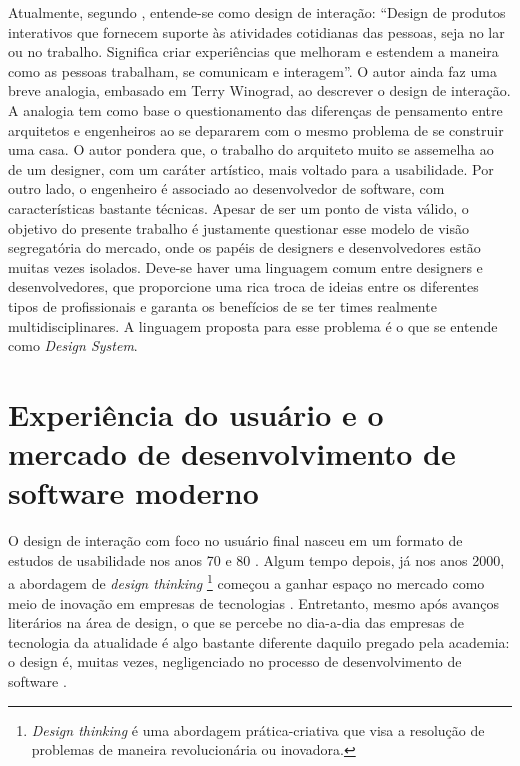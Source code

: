 Atualmente, segundo , entende-se como design de interação:
“Design de produtos interativos que fornecem suporte às atividades cotidianas das pessoas, seja no lar ou no trabalho. Significa criar experiências que melhoram e estendem a maneira como as pessoas trabalham, se comunicam e interagem”. 
O autor ainda faz uma breve analogia, embasado em Terry Winograd, ao descrever o design de interação. A analogia tem como base o questionamento das diferenças de pensamento entre arquitetos e engenheiros ao se depararem com o mesmo problema de se construir uma casa. O autor pondera que, o trabalho do arquiteto muito se assemelha ao de um designer, com um caráter artístico, mais voltado para a usabilidade. Por outro lado, o engenheiro é associado ao desenvolvedor de software, com características bastante técnicas. Apesar de ser um ponto de vista válido, o objetivo do presente trabalho é justamente questionar esse modelo de visão segregatória do mercado, onde os papéis de designers e desenvolvedores estão muitas vezes isolados. Deve-se haver uma linguagem comum entre designers e desenvolvedores, que proporcione uma rica troca de ideias entre os diferentes tipos de profissionais e garanta os benefícios de se ter times realmente multidisciplinares. A linguagem proposta para esse problema é o que se entende como \textit{Design System}.

\section{Experiência do usuário e o mercado de desenvolvimento de software moderno}
\label{experienciaUsuarioMercado}

O design de interação com foco no usuário final nasceu em um formato de estudos de usabilidade nos anos 70 e 80 \cite{gould1985designing, nielsen1994usability}. Algum tempo depois, já nos anos 2000, a abordagem de \textit{design thinking} \footnote{\textit{Design thinking} é uma abordagem prática-criativa que visa a resolução de problemas de maneira revolucionária ou inovadora.} começou a ganhar espaço no mercado como meio de inovação em empresas de tecnologias \cite{martin2009design}. Entretanto, mesmo após avanços literários na área de design, o que se percebe no dia-a-dia das empresas de tecnologia da atualidade é algo bastante diferente daquilo pregado pela academia: o design é, muitas vezes, negligenciado no processo de desenvolvimento de software \cite{ruissalo2018operating}.

